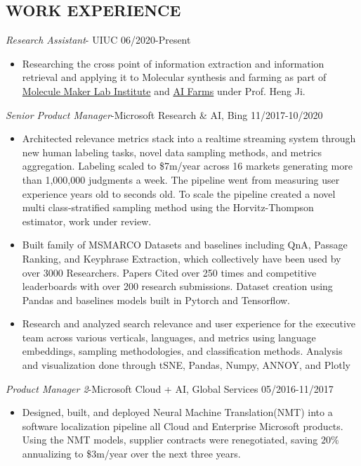 \documentclass[line,margin]{res}
\begin{document}
\begin{resume}
\section{WORK EXPERIENCE} 
{\sl Research Assistant}- UIUC \hfill 06/2020-Present
\begin{itemize}  \itemsep -4pt 
\item Researching the cross point of information extraction and information retrieval and applying it to Molecular synthesis and farming as part of \href{https://moleculemaker.org/}{Molecule Maker Lab Institute} and \href{https://digitalag.illinois.edu/2020/08/26/aifarms-award/}{AI Farms} under Prof. Heng Ji. 
\end{itemize}
{\sl Senior Product Manager}-Microsoft Research \& AI,  Bing  \hfill 11/2017-10/2020
\begin{itemize}  \itemsep -4pt 
\item Architected relevance metrics stack into a realtime streaming system through new human labeling tasks, novel data sampling methods, and metrics aggregation. Labeling scaled to \$7m/year across 16 markets generating more than 1,000,000 judgments a week. The pipeline went from measuring user experience years old to seconds old. To scale the pipeline created a novel multi class-stratified sampling method using the Horvitz-Thompson estimator, work under review.
\item  Built family of MSMARCO Datasets and baselines including QnA, Passage Ranking, and Keyphrase Extraction, which collectively have been used by over 3000 Researchers. Papers Cited over 250 times and competitive leaderboards with over 200 research submissions. Dataset creation using Pandas and baselines models built in Pytorch and Tensorflow.
\item Research and analyzed search relevance and user experience for the executive team across various verticals, languages, and metrics using language embeddings, sampling methodologies, and classification methods. Analysis and visualization done through tSNE, Pandas, Numpy, ANNOY, and Plotly
\end{itemize}
{\sl Product Manager 2}-Microsoft Cloud + AI, Global Services \hfill 05/2016-11/2017
\begin{itemize}  \itemsep -4pt
\item Designed, built, and deployed Neural Machine Translation(NMT) into a software localization pipeline all Cloud and Enterprise Microsoft products. Using the NMT models, supplier contracts were renegotiated, saving $20\%$ annualizing to \$3m/year over the next three years.

\end{itemize}
\end{resume}
\end{document}
